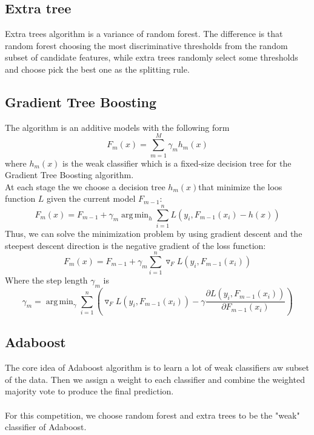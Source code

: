 \documentclass[conference]{IEEEtran}
\DeclareMathOperator*{\argmin}{arg\,min}
\begin{document}
\subsection{Extra tree}
Extra trees algorithm is a variance of random forest. The difference is that random forest choosing the most discriminative thresholds from the random subset of candidate features, while extra trees randomly select some thresholds and choose pick the best one as the splitting rule.

\subsection{Gradient Tree Boosting}
The algorithm is an additive models with the following form
\begin{equation}
F_m(x)=\sum_{m=1}^{M}\gamma_m h_m(x)
\end{equation}
where $h_m(x)$ is the weak classifier which is a fixed-size decision tree for the Gradient Tree Boosting algorithm. \\
At each stage the we choose a decision tree $h_m(x)$that minimize the loos function $L$ given the current model $F_{m-1}$:  
\begin{equation}
F_m(x)=F_{m-1}+\gamma_m \argmin_h\sum_{i=1}^n L(y_i,F_{m-1}(x_i)-h(x))
\end{equation}
\indent Thus, we can solve the minimization problem by using gradient descent and the steepest descent direction is the negative gradient of the loss function:
\begin{equation}
F_m(x)=F_{m-1}+\gamma_m \sum_{i=1}^n \triangledown_F L(y_i,F_{m-1}(x_i))
\end{equation}
Where the step length $\gamma_m$ is 
\begin{equation}
\gamma_m=\argmin_{\gamma}\sum_{i=1}^n(\triangledown_F L(y_i,F_{m-1}(x_i))-\gamma\frac{\partial L(y_i,F_{m-1}(x_i))}{\partial F_{m-1}(x_i)}) 
\end{equation}

\subsection{Adaboost}
The core idea of Adaboost algorithm is to learn a lot of weak classifiers aw subset of the data. Then we assign a weight to each classifier and combine the weighted majority vote to produce the final prediction. \\ \\
For this competition, we choose random forest and extra trees to be the "weak" classifier of Adaboost. 
\end{document}
